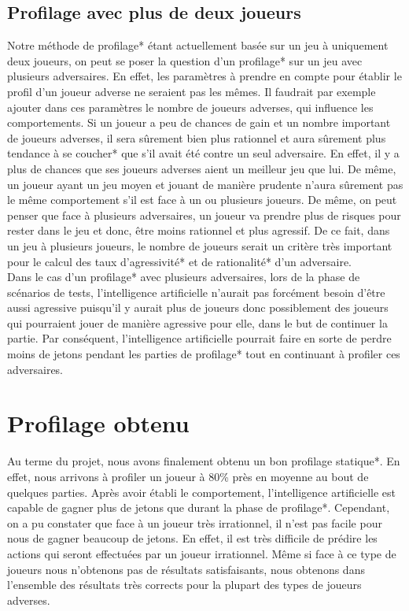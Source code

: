 \documentclass{report}
\begin{document}
\subsection{Profilage avec plus de deux joueurs}
\hspace{0.5cm}Notre méthode de profilage* étant actuellement basée sur un jeu à uniquement deux joueurs, on peut se poser la question d'un profilage* sur un jeu avec plusieurs adversaires. En effet, les paramètres à prendre en compte pour établir le profil d'un joueur adverse ne seraient pas les mêmes. Il faudrait par exemple ajouter dans ces paramètres le nombre de joueurs adverses, qui influence les comportements. Si un joueur a peu de chances de gain et un nombre important de joueurs adverses, il sera sûrement bien plus rationnel et aura sûrement plus tendance à se coucher* que s'il avait été contre un seul adversaire. En effet, il y a plus de chances que ses joueurs adverses aient un meilleur jeu que lui. De même, un joueur ayant un jeu moyen et jouant de manière prudente n'aura sûrement pas le même comportement s'il est face à un ou plusieurs joueurs. De même, on peut penser que face à plusieurs adversaires, un joueur va prendre plus de risques pour rester dans le jeu et donc, être moins rationnel et plus agressif. De ce fait, dans un jeu à plusieurs joueurs, le nombre de joueurs serait un critère très important pour le calcul des taux d'agressivité* et de rationalité* d'un adversaire. \\

Dans le cas d'un profilage* avec plusieurs adversaires, lors de la phase de scénarios de tests, l'intelligence artificielle n'aurait pas forcément besoin d'être aussi agressive puisqu'il y aurait plus de joueurs donc possiblement des joueurs qui pourraient jouer de manière agressive pour elle, dans le but de continuer la partie. Par conséquent, l'intelligence artificielle pourrait faire en sorte de perdre moins de jetons pendant les parties de profilage* tout en continuant à profiler ces adversaires.\par 


\section{Profilage obtenu}
\hspace{0.5cm}Au terme du projet, nous avons finalement obtenu un bon profilage statique*. En effet, nous arrivons à profiler un joueur à 80\% près en moyenne au bout de quelques parties. Après avoir établi le comportement, l'intelligence artificielle est capable de gagner plus de jetons que durant la phase de profilage*. Cependant, on a pu constater que face à un joueur très irrationnel, il n'est pas facile pour nous de gagner beaucoup de jetons. En effet, il est très difficile de prédire les actions qui seront effectuées par un joueur irrationnel. Même si face à ce type de joueurs nous n'obtenons pas de résultats satisfaisants, nous obtenons dans l'ensemble des résultats très corrects pour la plupart des types de joueurs adverses.\par
\end{document}

